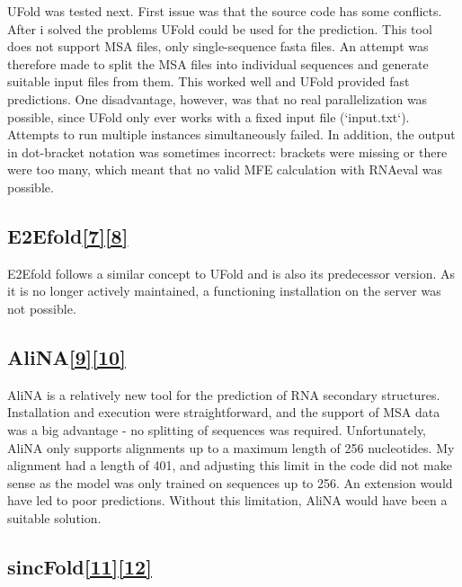 \documentclass{article}
\begin{document}
\begin{large}
\begin{large}
\begin{large}
UFold was tested next. First issue was that the source code has some conflicts. After i solved the problems UFold could be used for the prediction. This tool does not support MSA files, only single-sequence fasta files. An attempt was therefore made to split the MSA files into individual sequences and generate suitable input files from them. This worked well and UFold provided fast predictions. One disadvantage, however, was that no real parallelization was possible, since UFold only ever works with a fixed input file (`input.txt`). Attempts to run multiple instances simultaneously failed. In addition, the output in dot-bracket notation was sometimes incorrect: brackets were missing or there were too many, which meant that no valid MFE calculation with RNAeval was possible.

\subsection{{E2Efold}\href{https://doi.org/10.48550/arXiv.2002.05810}{\textbf{[7]}}\href{https://github.com/ml4bio/e2efold}{\textbf{[8]}}}

E2Efold follows a similar concept to UFold and is also its predecessor version. As it is no longer actively maintained, a functioning installation on the server was not possible.

\subsection{{AliNA}\href{https://doi.org/10.1002/minf.202300113}{\textbf{[9]}}\href{https://github.com/Arty40m/AliNA}{\textbf{[10]}}}

AliNA is a relatively new tool for the prediction of RNA secondary structures. Installation and execution were straightforward, and the support of MSA data was a big advantage - no splitting of sequences was required. Unfortunately, AliNA only supports alignments up to a maximum length of 256 nucleotides. My alignment had a length of 401, and adjusting this limit in the code did not make sense as the model was only trained on sequences up to 256. An extension would have led to poor predictions. Without this limitation, AliNA would have been a suitable solution.

\subsection{{sincFold}\href{https://doi.org/10.1093/bib/bbae271}{\textbf{[11]}}\href{https://github.com/sinc-lab/sincFold}{\textbf{[12]}}}


\end{large}
\end{large}
\end{large}
\end{document}
